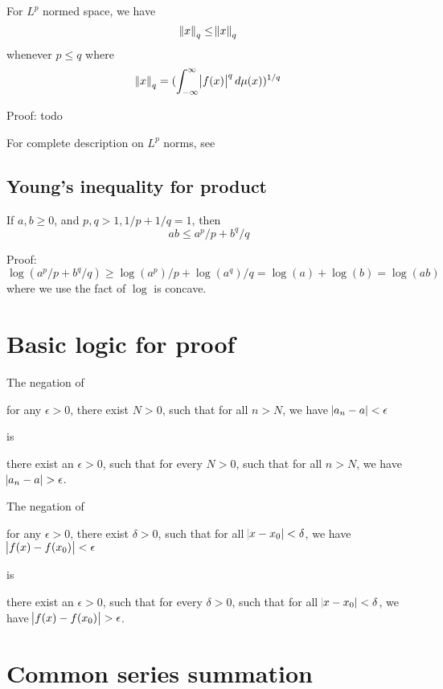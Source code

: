 \begin{refsection}
\begin{theorem}
 \cite{wiki:Lpspace}For $L^p$ normed space, we have
$$\norm{x}_q \leq \norm{x}_q$$ whenever $p\leq q$
where
$$\norm{x}_q = (\int_{-\infty}^\infty \abs{f(x)}^q d\mu(x))^{1/q}$$
\end{theorem}
Proof: todo


\begin{remark}
For complete description on $L^p$ norms, see \cite{wiki:Lpspace}
\end{remark}


\subsection{Young's inequality for product}
\begin{lemma}
If $a,b \geq 0$, and $p,q >1, 1/p+1/q = 1$, then
$$ab\leq a^p/p + b^q/q$$
\end{lemma}
Proof: $$\log(a^p/p + b^q/q) \geq \log(a^p)/p + \log(a^q)/q = \log(a)+\log(b) = \log(ab)$$
where we use the fact of $\log$ is concave.



\section{Basic logic for proof}


\cite[60]{hammack2013book}The negation of 
\begin{mdframed}
for any $\epsilon > 0$, there exist $N>0$, such that for all $n > N$, we have $\abs{a_n - a} < \epsilon$
\end{mdframed}
is
\begin{mdframed}
there exist an $\epsilon > 0$, such that for every $N>0$, such that for all $n > N$, we have $\abs{a_n - a} > \epsilon$.
\end{mdframed}


\cite[60]{hammack2013book}The negation of 
\begin{mdframed}
for any $\epsilon > 0$, there exist $\delta>0$, such that for all $\abs{x-x_0} < \delta$, we have $\abs{f(x) - f(x_0)} < \epsilon$
\end{mdframed}
is
\begin{mdframed}
there exist an $\epsilon > 0$, such that for every $\delta>0$, such that for all $\abs{x-x_0} < \delta$, we have $\abs{f(x) - f(x_0)} > \epsilon$.
\end{mdframed}

\section{Common series summation}


\end{refsection}
